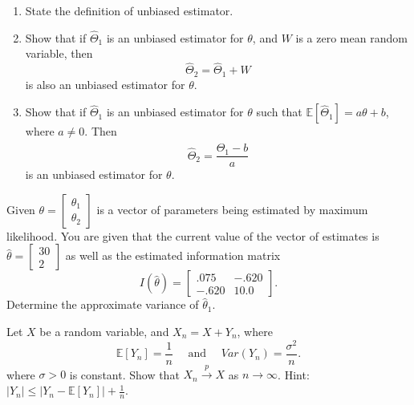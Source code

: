 \begin{mdframed}
    \begin{Exercise}
        \begin{enumerate}
            \item State the definition of unbiased estimator.
            \item Show that if $\widehat{\Theta}_1$ is an unbiased estimator for $\theta$, and $W$ is a zero mean random variable, then 
            \[
                \widehat{\Theta}_2 = \widehat{\Theta}_1 + W
            \]
            is also an unbiased estimator for $\theta$.
            \item Show that if $\widehat{\Theta}_1$ is an unbiased estimator for $\theta$ such that $\mathbb{E}[\widehat{\Theta}_1] = a\theta + b$, where $a \neq 0$. Then 
            \[
                \widehat{\Theta}_2 = \frac{\widehat{\Theta}_1 - b}{a}
            \]
            is an unbiased estimator for $\theta$.
        \end{enumerate}
    \end{Exercise}

    \begin{Exercise}
        Given $\theta = \begin{bmatrix}
            \theta_1 \\ \theta_2
        \end{bmatrix}$
        is a vector of parameters being estimated by maximum likelihood. You are 
        given that the current value of the vector of estimates is 
        $\widehat{\theta} = \begin{bmatrix}
            30 \\ 2
        \end{bmatrix}$ as well as the estimated information matrix 
        \[
            I(\widehat{\theta}) = \begin{bmatrix}
                .075 & -.620\\
                -.620 & 10.0
            \end{bmatrix}.
        \]
        Determine the approximate variance of $\widehat{\theta}_1$.
    \end{Exercise}

    \begin{Exercise}
        Let $X$ be a random variable, and $X_n = X + Y_n$, where 
        \[
            \mathbb{E}[Y_n] = \frac{1}{n} \quad \text{ and } \quad Var(Y_n) = \frac{\sigma^2}{n}.
        \]
        where $\sigma > 0$ is constant. Show that $X_n \xrightarrow{p} X$ as $n \to \infty$. Hint: $\displaystyle |Y_n| \leq |Y_n - \mathbb{E}[Y_n]| + \frac{1}{n}$.
    \end{Exercise}
\end{mdframed}